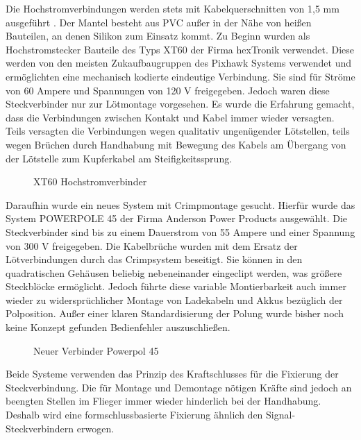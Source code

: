 Die Hochstromverbindungen werden stets mit Kabelquerschnitten von 1,5 mm ausgeführt \cite{DIN_VDE_0298}. Der Mantel besteht aus PVC außer in der Nähe von heißen Bauteilen, an denen Silikon zum Einsatz kommt.
Zu Beginn wurden als Hochstromstecker Bauteile des Typs XT60 der Firma hexTronik verwendet.
Diese werden von den meisten Zukaufbaugruppen des Pixhawk Systems verwendet und ermöglichten eine mechanisch kodierte eindeutige Verbindung.
Sie sind für Ströme von 60 Ampere und Spannungen von 120 V freigegeben.
Jedoch waren diese Steckverbinder nur zur Lötmontage vorgesehen. Es wurde die Erfahrung gemacht, dass die Verbindungen zwischen Kontakt und  Kabel immer wieder versagten. Teils versagten die Verbindungen wegen qualitativ ungenügender Lötstellen, teils wegen Brüchen durch Handhabung mit Bewegung des Kabels am Übergang von der Lötstelle zum Kupferkabel am Steifigkeitssprung.

\begin{figure}[H]
\centering
{}
\caption{XT60 Hochstromverbinder} 
\label{fig:XT60 Hochstromverbinder}
\end{figure}

Daraufhin wurde ein neues System mit Crimpmontage gesucht.
Hierfür wurde das System POWERPOLE 45 der Firma Anderson Power Products ausgewählt. Die Steckverbinder sind bis zu einem Dauerstrom von 55 Ampere und einer Spannung von 300 V freigegeben.
Die Kabelbrüche wurden mit dem Ersatz der Lötverbindungen durch das Crimpsystem beseitigt. Sie können in den quadratischen Gehäusen beliebig nebeneinander eingeclipt werden, was größere Steckblöcke ermöglicht. Jedoch führte diese variable Montierbarkeit auch immer wieder zu widersprüchlicher Montage von Ladekabeln und Akkus bezüglich der Polposition.
Außer einer klaren Standardisierung der Polung wurde bisher noch keine Konzept gefunden Bedienfehler auszuschließen. 

\begin{figure}[H]
\centering
{}
\caption{Neuer Verbinder  Powerpol 45} 
\label{fig:Neuer Verbinder  Powerpol 45}
\end{figure}

Beide Systeme verwenden das Prinzip des Kraftschlusses für die Fixierung der Steckverbindung. Die für Montage und Demontage nötigen Kräfte sind jedoch an beengten Stellen im Flieger immer wieder hinderlich bei der Handhabung. Deshalb wird eine formschlussbasierte Fixierung ähnlich den Signal-Steckverbindern erwogen.

